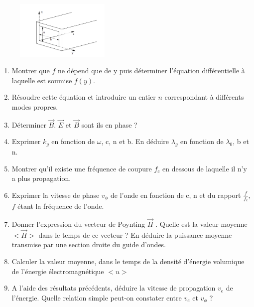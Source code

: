 \documentclass{article}
\begin{document}
\begin{figure}[h]
  \centering
  \includegraphics[width=0.4\textwidth]{schéma_guide_d'ondes.png}
  \label{fig:schéma_guide_'ondes}
\end{figure}
\begin{enumerate}
    \item Montrer que $f$ ne dépend que de y puis déterminer l'équation différentielle à laquelle est soumise $f(y)$.
    \item Résoudre cette équation et introduire un entier $n$ correspondant à différents modes propres. 
    \item Déterminer $\vec{B}$. $\vec{E}$ et $\vec{B}$ sont ils en phase ? 
    \item Exprimer $k_g$ en fonction de $\omega$, c, n et b. En déduire $\lambda_g$ en fonction de $\lambda_0$, b et n.
    \item Montrer qu’il existe une fréquence de coupure $f_c$ en dessous de laquelle il n’y a plus propagation.
    \item Exprimer la vitesse de phase $v_\phi$ de l’onde en fonction de c, n et du rapport $\frac{f}{f_c}$, $f$ étant la fréquence de l'onde.
    \item  Donner l’expression du vecteur de Poynting $\vec{\Pi}$ . Quelle est
    la valeur moyenne  $<\vec{\Pi}>$ dans le temps de ce vecteur ?
    En déduire la puissance moyenne transmise par une section droite du guide d’ondes.
    \item Calculer la valeur moyenne, dans le temps de la densité d’énergie volumique de l’énergie
    électromagnétique $<u>$
    \item A l’aide des résultats précédents, déduire la vitesse de propagation $v_e$ de l’énergie.
    Quelle relation simple peut-on constater entre $v_e $ et $v_\phi$ ? \\[2cm]
\end{enumerate}
\end{document}

